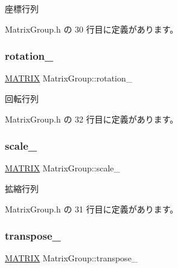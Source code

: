 座標行列 



 Matrix\+Group.\+h の 30 行目に定義があります。

\mbox{\label{class_matrix_group_a614eb91623028b6c29bd8890f6f1c6d1}} 
\subsubsection{\texorpdfstring{rotation\+\_\+}{rotation\_}}
{\footnotesize\ttfamily \mbox{\hyperlink{_matrix_8h_a032295cd9fb1b711757c90667278e744}{M\+A\+T\+R\+IX}} Matrix\+Group\+::rotation\+\_\+\hspace{0.3cm}{\ttfamily [private]}}



回転行列 



 Matrix\+Group.\+h の 32 行目に定義があります。

\mbox{\label{class_matrix_group_a51698db9bd361a12b1450a9596bdcd97}} 
\subsubsection{\texorpdfstring{scale\+\_\+}{scale\_}}
{\footnotesize\ttfamily \mbox{\hyperlink{_matrix_8h_a032295cd9fb1b711757c90667278e744}{M\+A\+T\+R\+IX}} Matrix\+Group\+::scale\+\_\+\hspace{0.3cm}{\ttfamily [private]}}



拡縮行列 



 Matrix\+Group.\+h の 31 行目に定義があります。

\mbox{\label{class_matrix_group_a1e5305fc950112de091922f97dc2872d}} 
\subsubsection{\texorpdfstring{transpose\+\_\+}{transpose\_}}
{\footnotesize\ttfamily \mbox{\hyperlink{_matrix_8h_a032295cd9fb1b711757c90667278e744}{M\+A\+T\+R\+IX}} Matrix\+Group\+::transpose\+\_\+\hspace{0.3cm}{\ttfamily [private]}}



